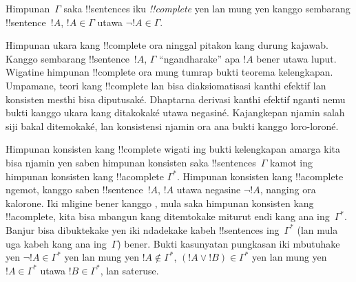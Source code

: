 \documentclass[../../../include/open-logic-section]{subfiles}
\begin{document}
      {}
      {}
      

\begin{defn}
 Himpunan~$\Gamma$ saka !!{sentence}s iku
\emph{!!{complete}} yen lan mung yen kanggo sembarang !!{sentence}~$!A$,
$!A \in \Gamma$ utawa $\lnot !A \in \Gamma$.
\end{defn}

\begin{explain}
Himpunan ukara kang !!{complete} ora ninggal pitakon kang durung kajawab.
Kanggo sembarang !!{sentence}~$!A$, $\Gamma$ ``ngandharake'' apa $!A$
bener utawa luput. Wigatine himpunan !!{complete} ora mung tumrap bukti
teorema kelengkapan. Umpamane, teori kang !!{complete} lan bisa
diaksiomatisasi kanthi efektif lan konsisten mesthi bisa diputusaké. Dhaptarna derivasi kanthi
efektif nganti nemu bukti kanggo ukara kang ditakokaké utawa negasiné.
Kajangkepan njamin salah siji bakal ditemokaké, lan konsistensi
njamin ora ana bukti kanggo loro-loroné.
\end{explain}

\begin{explain}
Himpunan konsisten kang !!{complete} wigati ing bukti kelengkapan amarga
kita bisa njamin yen saben himpunan konsisten saka
!!{sentence}s~$\Gamma$ kamot ing himpunan konsisten kang !!a{complete}
$\Gamma^*$. Himpunan konsisten kang !!a{complete} ngemot, kanggo saben
!!{sentence}~$!A$, $!A$ utawa negasine $\lnot !A$, nanging ora
kalorone. Iki mligine bener kanggo , mula saka himpunan
konsisten kang !!a{complete}, kita bisa mbangun
 kang
 ditemtokake miturut
 endi kang
ana ing~$\Gamma^*$. Banjur bisa dibuktekake yen
 iki ndadekake kabeh
!!{sentence}s ing~$\Gamma^*$ (lan mula uga kabeh kang ana
ing~$\Gamma$) bener. Bukti kasunyatan pungkasan iki mbutuhake yen
$\lnot !A \in \Gamma^*$ yen lan mung yen $!A \notin \Gamma^*$,
$(!A \lor !B) \in \Gamma^*$ yen lan mung yen $!A \in \Gamma^*$ utawa
$!B \in \Gamma^*$, lan sateruse.
\end{explain}
\end{document}
